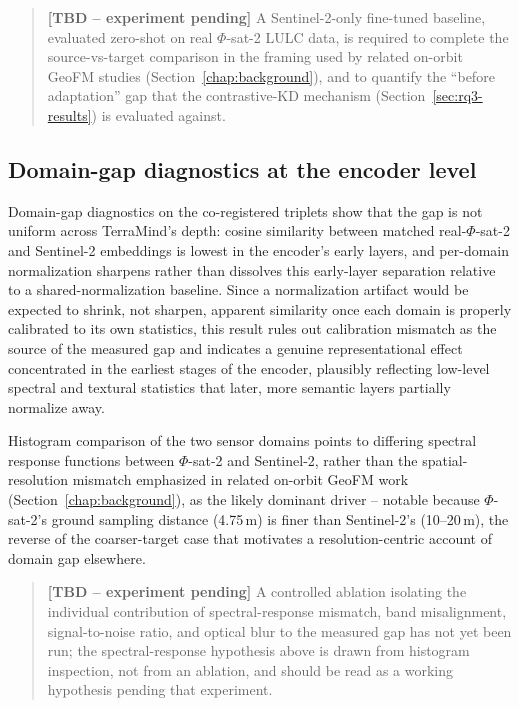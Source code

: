 \begin{quote}
    \textbf{[TBD -- experiment pending]}
    A Sentinel-2-only fine-tuned baseline, evaluated zero-shot on real $\Phi$-sat-2 LULC data, is required to complete the source-vs-target comparison in the framing used by related on-orbit GeoFM studies (Section~\ref{chap:background}), and to quantify the ``before adaptation'' gap that the contrastive-KD mechanism (Section~\ref{sec:rq3-results}) is evaluated against.
\end{quote}

\subsection{Domain-gap diagnostics at the encoder level}

Domain-gap diagnostics on the co-registered triplets show that the gap is not uniform across TerraMind's depth: cosine similarity between matched real-$\Phi$-sat-2 and Sentinel-2 embeddings is lowest in the encoder's early layers, and per-domain normalization sharpens rather than dissolves this early-layer separation relative to a shared-normalization baseline.
Since a normalization artifact would be expected to shrink, not sharpen, apparent similarity once each domain is properly calibrated to its own statistics, this result rules out calibration mismatch as the source of the measured gap and indicates a genuine representational effect concentrated in the earliest stages of the encoder, plausibly reflecting low-level spectral and textural statistics that later, more semantic layers partially normalize away.

Histogram comparison of the two sensor domains points to differing spectral response functions between $\Phi$-sat-2 and Sentinel-2, rather than the spatial-resolution mismatch emphasized in related on-orbit GeoFM work (Section~\ref{chap:background}), as the likely dominant driver -- notable because $\Phi$-sat-2's ground sampling distance (4.75\,m) is finer than Sentinel-2's (10--20\,m), the reverse of the coarser-target case that motivates a resolution-centric account of domain gap elsewhere.

\begin{quote}
    \textbf{[TBD -- experiment pending]}
    A controlled ablation isolating the individual contribution of spectral-response mismatch, band misalignment, signal-to-noise ratio, and optical blur to the measured gap has not yet been run; the spectral-response hypothesis above is drawn from histogram inspection, not from an ablation, and should be read as a working hypothesis pending that experiment.
\end{quote}


